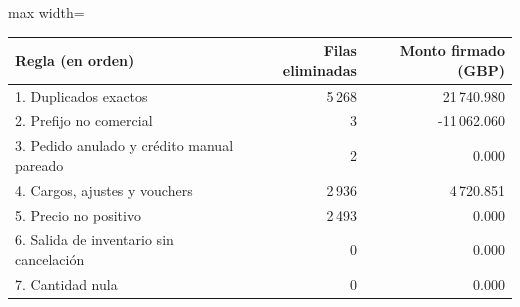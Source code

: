 \begin{center}\small\setlength{\tabcolsep}{4pt}
\begin{adjustbox}{max width=\textwidth}\begin{tabular}{p{8cm}rr}
\toprule
Regla (en orden) & Filas eliminadas & Monto firmado (GBP) \\ \midrule
1. Duplicados exactos & 5\,268 & 21\,740.980 \\
2. Prefijo no comercial & 3 & -11\,062.060 \\
3. Pedido anulado y crédito manual pareado & 2 & 0.000 \\
4. Cargos, ajustes y vouchers & 2\,936 & 4\,720.851 \\
5. Precio no positivo & 2\,493 & 0.000 \\
6. Salida de inventario sin cancelación & 0 & 0.000 \\
7. Cantidad nula & 0 & 0.000 \\
\bottomrule\end{tabular}\end{adjustbox}\end{center}
